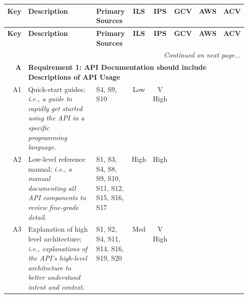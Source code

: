 \begin{landscape}
{\def\cn{}
\def\cy{\checkmark}
\footnotesize
\begin{longtable}{rp{0.45\linewidth}|p{0.125\linewidth}|cc|ccc}
  \toprule
  \textbf{Key} &
  \textbf{Description} &
  \textbf{Primary Sources} &
  \textbf{ILS} &
  \textbf{IPS} & 
  \textbf{GCV} &
  \textbf{AWS} &
  \textbf{ACV} \\
  \midrule
  \midrule
  \endfirsthead
  \toprule
  \textbf{Key} &
  \textbf{Description} &
  \textbf{Primary Sources} &
  \textbf{ILS} &
  \textbf{IPS} &
  \textbf{GCV} &
  \textbf{AWS} &
  \textbf{ACV} \\
  \midrule
  \midrule
  \endhead
  \bottomrule
  
  \multicolumn{8}{r}{\textit{Continued on next page...}}\\
  \endfoot
  \bottomrule
  \endlastfoot


   \textbf{A}&
  \multicolumn{7}{l}{\textbf{Requirement 1: API Documentation should include Descriptions of API Usage}}\\
  \midrule

  A1&
  Quick-start guides; \textit{i.e., a guide to rapidly get started using the API in a specific programming language.}&
  \scriptsize S4, S9, S10 &
  \cellcolor[HTML]{f6b26b}Low&\cellcolor[HTML]{57bb8a}V High&\circlepresent{}&\circlepartialpresent{}&\circlepresent{}\\
  
  A2&
  Low-level reference manual; \textit{i.e., a manual documenting all API components to review fine-grade detail.}&
  \scriptsize S1, S3, S4, S8, S9, S10, S11, S12, S15, S16, S17 &
  \cellcolor[HTML]{a7c47d}High&\cellcolor[HTML]{a7c47d}High&\circlepresent{}&\circlepresent{}&\circlepresent{}\\
  
  A3&
  Explanation of high level architecture; \textit{i.e., explanations of the API's high-level architecture to better understand intent and context.}
  &
  \scriptsize S1, S2, S4, S11, S14, S16, S19, S20 &
  \cellcolor[HTML]{ffd666}Med&\cellcolor[HTML]{57bb8a}V High&\circlepresent{}&\circlepresent{}&\circlepresent{}\\


\end{longtable}}
\end{landscape}
